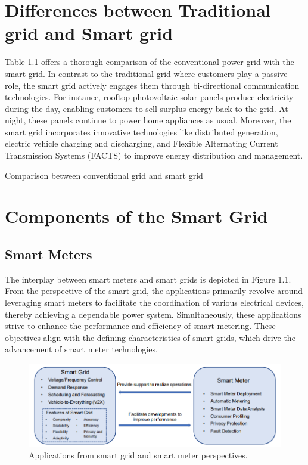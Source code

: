 \section{Differences between Traditional grid and Smart grid }
Table 1.1 offers a thorough comparison of the conventional power grid with the smart grid. In contrast to the traditional grid where customers play a passive role, the smart grid actively engages them through bi-directional communication technologies. For instance, rooftop photovoltaic solar panels produce electricity during the day, enabling customers to sell surplus energy back to the grid. At night, these panels continue to power home appliances as usual. Moreover, the smart grid incorporates innovative technologies like distributed generation, electric vehicle charging and discharging, and Flexible Alternating Current Transmission Systems (FACTS) to improve energy distribution and management.\cite{zhang2014smart}
\begin{table}[h]
  
	\caption{Comparison between conventional grid and smart grid \cite{miller2008understanding}}
    
	\label{tab:my_label}
\end{table}


\section{Components of the Smart Grid }  

\subsection{Smart Meters}
The interplay between smart meters and smart grids is depicted in Figure 1.1. From the perspective of the smart grid, the applications primarily revolve around leveraging smart meters to facilitate the coordination of various electrical devices, thereby achieving a dependable power system. Simultaneously, these applications strive to enhance the performance and efficiency of smart metering. These objectives align with the defining characteristics of smart grids, which drive the advancement of smart meter technologies.\cite{chen2023control}
\begin{figure}[h]
	\centering
	\includegraphics[width=\textwidth]{figures/SmartMeter.PNG}
	\caption{Applications from smart grid and smart meter perspectives. \cite{chen2023control}}
	\label{fig:example}
\end{figure}
